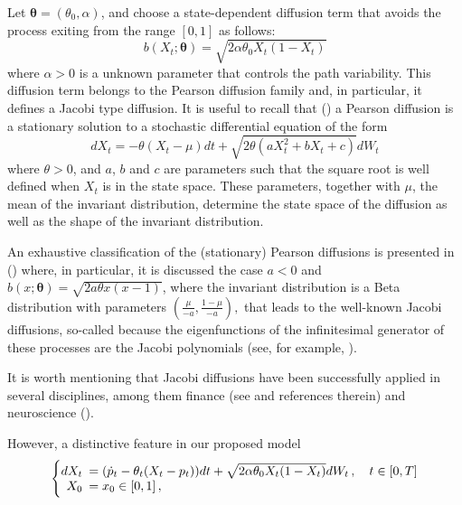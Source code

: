 \documentclass[11pt]{article}
\theoremstyle{definition}
\begin{document}
Let $\bm{\theta} = (\theta_0,\alpha)$, and choose a state-dependent diffusion term that avoids the process exiting from the range $[0,1]$ as follows:
  \begin{equation}
    b (X_t; \bm{\theta} )= \sqrt{2 \alpha \theta_0 X_t (1 - X_t)}
  \end{equation}
  where $\alpha >0$ is a unknown parameter that controls the path variability. This diffusion term belongs to the Pearson diffusion family and, in particular, it defines a Jacobi type diffusion. It is useful to recall that (\cite[440]{foso}) a Pearson diffusion is a stationary solution to a stochastic differential equation of the form
 \begin{equation}
    dX_t = - \theta (X_t - \mu) dt + \sqrt{2 \theta (a X_t^2 + b X_t + c)} dW_t
  \end{equation}
where $\theta>0$, and $a$, $b$ and $c$ are parameters such that the square root is well defined when $X_t$ is in the state space. These parameters, together with $\mu$, the mean of the invariant distribution, determine the state space of the diffusion as well as the shape of the invariant distribution. 

An exhaustive classification of the (stationary) Pearson diffusions is presented in (\cite[440-443]{foso}) where, in particular, it is discussed the case $a < 0$ and $b(x; \bm{\theta}) = \sqrt{2 a \theta x (x-1)}$, where the invariant distribution is a Beta distribution with parameters $\left( \frac{\mu}{-a}, \frac{1 - \mu}{-a} \right),$ that leads to the well-known Jacobi diffusions, so-called because the eigenfunctions of the infinitesimal generator of these processes are the Jacobi polynomials (see, for example, \cite[2860-2861]{leph}). 

It is worth mentioning that Jacobi diffusions have been successfully applied in several disciplines, among them finance (see \cite{vago} and references therein) and neuroscience (\cite{dotala}).

However, a distinctive feature in our proposed model 
\begin{equation}
  \left\{
  \begin{array}{@{}rl@{}}
    dX_t \!\!\!&= (\dot{p}_t  - \theta_t (X_t - p_t) ) dt +\sqrt{2 \alpha \theta_0 X_t (1 - X_t)} dW_t\,, \quad t \in [0,T]  \\
   X_0  \!\!\!&=  x_0\in [0,1] \,,
 \end{array}\right.  \label{ourmodel}
\end{equation}
\end{document}

